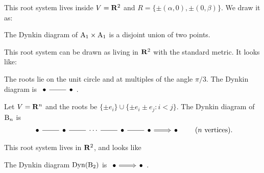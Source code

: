 \begin{example}
This root system lives inside $V=\mathbf{R}^2$ and 
$R=\{\pm (\alpha,0),\pm (0,\beta)\}$. We draw it as: 
\begin{center}
\end{center}
The Dynkin diagram of $\mathrm{A}_1\times \mathrm{A}_1$ is a disjoint union of 
two points. 
\end{example}


\begin{example}
This root system can be drawn as living in $\mathbf{R}^2$ with the standard metric. It 
looks like:
\begin{center}
\end{center}
The roots lie on the unit circle and at multiples of the angle $\pi/3$. 
The Dynkin diagram is 
$\begin{tikzcd} \bullet \ar[r, dash] & \bullet \end{tikzcd}$. 
\end{example}

\begin{example}
Let $V=\mathbf{R}^n$ and the roots be $\{\pm e_i\}\cup \{\pm e_i\pm e_j:i<j\}$. The 
Dynkin diagram of $\mathrm{B}_n$ is 
\[
\begin{tikzcd}
  \bullet \ar[r, dash] 
    & \bullet \ar[r, dash] 
    & \cdots \ar[r, dash] 
    & \bullet \ar[r, dash] 
    & \bullet \ar[r, Rightarrow] 
    & \bullet 
\end{tikzcd}
\qquad\text{($n$ vertices)} .
\]
\end{example}

\begin{example}
This root system lives in $\mathbf{R}^2$, and looks like 
\begin{center}
\end{center}
The Dynkin diagram $\operatorname{Dyn}(\mathrm{B}_2)$ is 
$\begin{tikzcd}\bullet \ar[r, Rightarrow] & \bullet \end{tikzcd}$. 
\end{example}

